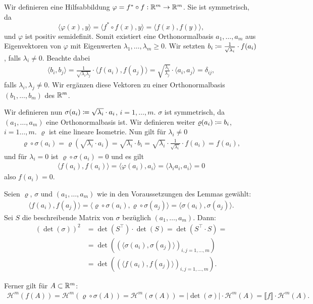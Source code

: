 \documentclass[a4paper,twoside,DIV15,BCOR12mm]{scrbook}
\newcommand{\HM}{\mathscr H}
\begin{document}
\begin{beweis}
Wir definieren eine Hilfsabbildung $\varphi = f^* \circ f : \mathbb{R}^m\to\mathbb{R}^m$. Sie ist symmetrisch, da 
\[
\langle \varphi(x),y \rangle = \langle f^* \circ f(x),y\rangle = \langle f(x),f(y)\rangle,
\]
und $\varphi$ ist positiv semidefinit. Somit existiert eine Orthonormalbasis $a_1,\ldots,a_m$ aus Eigenvektoren von $\varphi$ mit Eigenwerten $\lambda_1,\ldots,\lambda_m\ge 0$. Wir setzten $b_i \da \frac{1}{\sqrt{\lambda_i}} \cdot f(a_i)$, falls $\lambda_i \ne 0$. Beachte dabei
\begin{align*}
\langle b_i,b_j \rangle 
= \frac1{\sqrt{\lambda_i\lambda_j}} \cdot \langle f(a_i),f(a_j)\rangle 
= \sqrt{\frac{\lambda_i}{\lambda_j}} \cdot \langle a_i,a_j\rangle = \delta_{ij},
\end{align*}
falls $\lambda_i,\lambda_j\ne 0$. Wir ergänzen diese Vektoren zu einer Orthonormalbasis $(b_1,\ldots,b_m)$ des $\mathbb{R}^m$.

Wir definieren nun $\sigma(a_i) \da \sqrt{\lambda_i}\cdot a_i$, $i=1,\ldots,m$. $\sigma$ ist symmetrisch, da $(a_1,\ldots,a_m)$ eine Orthonormalbasis ist. Wir definieren weiter $\varrho(a_i) \da b_i$, $i=1\ldots,m$. $\varrho$ ist eine lineare Isometrie. Nun gilt für $\lambda_i \ne 0$
\begin{align*}
\varrho\circ\sigma(a_i) = \varrho(\sqrt{\lambda_i}\cdot a_i) = \sqrt{\lambda_i} \cdot b_i  = \sqrt{\lambda_i} \cdot \frac{1}{\sqrt{\lambda_i}} \cdot f(a_i) = f(a_i),
\end{align*}
und für $\lambda_i = 0$ ist $\varrho\circ\sigma(a_i)=0$ und es gilt
\begin{align*}
\langle f(a_i),f(a_i)\rangle = \langle\varphi(a_i),a_i\rangle = \langle \lambda_i a_i,a_i\rangle = 0
\end{align*}
also $f(a_i) = 0$.

Seien $\varrho$, $\sigma$ und $(a_1,\ldots,a_m)$ wie in den Voraussetzungen des Lemmas gewählt:
\begin{align*}
\langle f(a_i), f(a_j)\rangle = \langle \varrho\circ \sigma(a_i), \varrho\circ\sigma(a_j) \rangle = \langle \sigma(a_i),\sigma(a_j)\rangle.
\end{align*}
Sei $S$ die beschreibende Matrix von $\sigma$ bezüglich $(a_1,\ldots,a_m)$. Dann:
\begin{align*}
(\det(\sigma))^2
&= \det(S^\top)\cdot \det(S) = \det(S^\top\cdot S) = \\
&= \det( (\langle \sigma(a_i), \sigma(a_j)\rangle)_{i,j=1,\ldots,m}) \\
&= \det( (\langle f(a_i), f(a_j)\rangle)_{i,j=1,\ldots,m}).
\end{align*}

Ferner gilt für $A\subset\mathbb{R}^m$:
\begin{align*}
\HM^m(f(A)) = \HM^m(\varrho\circ\sigma(A)) = \HM^m(\sigma(A)) = |\det(\sigma)| \cdot \HM^m(A)  = \llbracket f \rrbracket \cdot \HM^m(A).
\end{align*}
\end{beweis}
\end{document}
